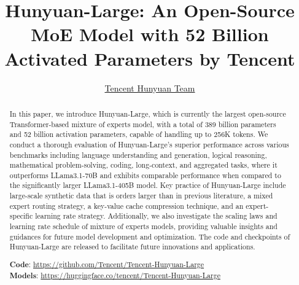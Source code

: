 \documentclass{article}
\title{Hunyuan-Large: An Open-Source MoE Model with 52 Billion Activated Parameters by Tencent}
\author{
}
\author{\hyperref[sec:contributors]{Tencent Hunyuan Team}}
\begin{document}
\maketitle
\begin{abstract}
In this paper, we introduce Hunyuan-Large, which is currently the largest open-source Transformer-based mixture of experts model, with a total of 389 billion parameters and 52 billion activation parameters, capable of handling up to 256K tokens. 
We conduct a thorough evaluation of Hunyuan-Large's superior performance across various benchmarks including language understanding and generation, logical reasoning, mathematical problem-solving, coding, long-context, and aggregated tasks, where it outperforms LLama3.1-70B and exhibits comparable performance when compared to the significantly larger LLama3.1-405B model. 
Key practice of Hunyuan-Large include large-scale synthetic data that is orders larger than in previous literature, a mixed expert routing strategy, a key-value cache compression technique, and an expert-specific learning rate strategy. 
Additionally, we also investigate the scaling laws and learning rate schedule of mixture of experts models, providing valuable insights and guidances for future model development and optimization. 
The code and checkpoints of Hunyuan-Large are released to facilitate future innovations and applications. 

\textbf{Code}: \href{https://github.com/Tencent/Hunyuan-Large}{https://github.com/Tencent/Tencent-Hunyuan-Large} \\
\textbf{Models}: \href{https://huggingface.co/tencent/Tencent-Hunyuan-Large}{https://huggingface.co/tencent/Tencent-Hunyuan-Large}
\end{abstract}
\end{document}
